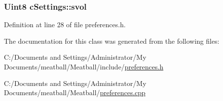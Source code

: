 \hypertarget{classc_settings_a21e639229b63224feb0d5a1667263f22}{
\subsubsection[{svol}]{\setlength{\rightskip}{0pt plus 5cm}Uint8 c\-Settings\-::svol}}\label{classc_settings_a21e639229b63224feb0d5a1667263f22}


Definition at line 28 of file preferences.\-h.



The documentation for this class was generated from the following files\-:\begin{DoxyCompactItemize}
\item 
C\-:/\-Documents and Settings/\-Administrator/\-My Documents/meatball/\-Meatball/include/\hyperlink{preferences_8h}{preferences.\-h}\item 
C\-:/\-Documents and Settings/\-Administrator/\-My Documents/meatball/\-Meatball/\hyperlink{preferences_8cpp}{preferences.\-cpp}\end{DoxyCompactItemize}

